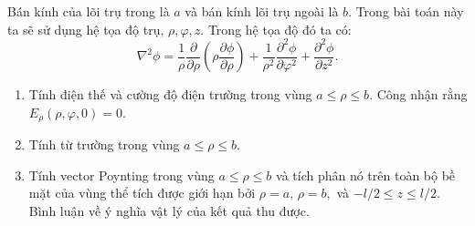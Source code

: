 \begin{vd}
\begin{center}
\end{center}

Bán kính của lõi trụ trong là $a$ và bán kính lõi trụ ngoài là $b$. Trong bài toán này ta sẽ sử dụng hệ tọa độ trụ, $\rho, \varphi, z$. Trong hệ tọa độ đó ta có:
   $$\nabla^2 \phi = \frac{1}{\rho}\frac{\partial}{\partial\rho}\left(\rho\frac{\partial\phi}{\partial\rho}\right) + \frac{1}{\rho^2} \frac{\partial^2 \phi}{\partial \varphi^2} + \frac{\partial^2 \phi}{\partial z^2}.$$
 \begin{enumerate}[1)] 
    \item Tính điện thế  và cường độ điện trường trong vùng $a\leq \rho \leq b$. Công nhận rằng $E_{\rho}(\rho, \varphi, 0) = 0$.
   \item Tính từ trường trong vùng $a \leq \rho \leq b$.
   \item Tính vector Poynting trong vùng $a\leq \rho \leq b$ và tích phân nó trên toàn bộ bề mặt của vùng thể tích được giới hạn bởi $\rho =a,\, \rho = b,$ và $-l/2 \leq z \leq l/2$. Bình luận về ý nghĩa vật lý của kết quả thu được.
  \end{enumerate}


\end{vd}

